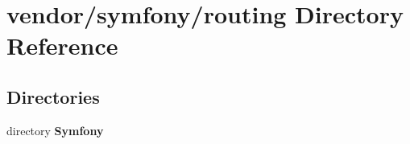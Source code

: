\section{vendor/symfony/routing Directory Reference}
\label{dir_f3f4380b294a94af61e802445c7a4076}
\subsection*{Directories}
\begin{DoxyCompactItemize}
\item 
directory {\bf Symfony}
\end{DoxyCompactItemize}
